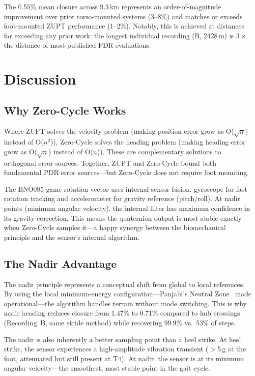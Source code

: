 \documentclass[11pt,a4paper]{article}
\begin{document}
The 0.55\% mean closure across 9.3\,km represents an order-of-magnitude
improvement over prior torso-mounted systems (3--8\%) and matches or exceeds
foot-mounted ZUPT performance (1--2\%). Notably, this is achieved at distances
far exceeding any prior work: the longest individual recording (B, 2428\,m) is
$3\times$ the distance of most published PDR evaluations.

\section{Discussion}
\label{sec:discussion}

\subsection{Why Zero-Cycle Works}

Where ZUPT solves the velocity problem (making position error grow as
O($\sqrt{n}$) instead of O($n^2$)), Zero-Cycle solves the heading problem
(making heading error grow as O($\sqrt{n}$) instead of O($n$)). These are
complementary solutions to orthogonal error sources. Together, ZUPT and
Zero-Cycle bound both fundamental PDR error sources---but Zero-Cycle does not
require foot mounting.

The BNO085 game rotation vector uses internal sensor fusion: gyroscope for fast
rotation tracking and accelerometer for gravity reference (pitch/roll). At
nadir points (minimum angular velocity), the internal filter has maximum
confidence in its gravity correction. This means the quaternion output is most
stable exactly when Zero-Cycle samples it---a happy synergy between the
biomechanical principle and the sensor's internal algorithm.

\subsection{The Nadir Advantage}

The nadir principle represents a conceptual shift from global to local
references. By using the local minimum-energy configuration---Panjabi's
Neutral Zone~\cite{panjabi1992} made operational---the algorithm handles
terrain without mode switching. This is why nadir heading reduces closure from
1.47\% to 0.71\% compared to hub crossings (Recording~B, same stride method)
while recovering 99.9\% vs.\ 53\% of steps.

The nadir is also inherently a better sampling point than a heel strike. At
heel strike, the sensor experiences a high-amplitude vibration transient
($>$5\,g at the foot, attenuated but still present at T4). At nadir, the
sensor is at its minimum angular velocity---the smoothest, most stable point in
the gait cycle.
\end{document}
